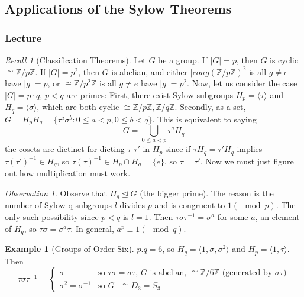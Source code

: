 \documentclass[12pt]{article}
\theoremstyle{definition}
\newtheorem{eg}[thm]{Example}
\theoremstyle{remark}
\newtheorem{obs}[thm]{Observation}
\newtheorem*{rec}{Recall}
\numberwithin{equation}{section}
\newcommand\Z{\mathbb Z}    %
\newcommand\nsub{\trianglelefteq}
\begin{document}
\vspace{15pt}


\subsection{Applications of the Sylow Theorems}

\subsubsection{Lecture}

\begin{rec}[Classification Theorems]
        Let $G$ be a group. If $|G| = p$, then $G$ is cyclic $\cong \Z/p\Z$. If $|G| = p^2$, then $G$ is abelian, and either $|cong (\Z/p\Z)^2$ is all $g\neq e$ have $|g| = p$, or $\cong \Z/p^2\Z$ is all $g\neq e$ have $|g| = p^2$. Now, let us consider the case $|G| = p\cdot q$, $p < q$ are primes: First, there exist Sylow subgroups $H_p = \langle \tau \rangle$ and $H_q = \langle \sigma \rangle$, which are both cyclic $\cong \Z/p\Z, \Z/q\Z$. Secondly, as a set, $G = H_pH_q = \{\tau^a\sigma^b:0\leq a < p, 0 \leq b < q\}$. This is equivalent to saying \begin{equation}
                G = \bigcup\limits_{0\leq a < p}\tau^aH_q
        \end{equation}
        the cosets are dictinct for dicting $\tau$ $\tau'$ in $H_p$ since if $\tau H_q = \tau'H_q$ implies $\tau(\tau')^{-1} \in H_q$, so $\tau(\tau)^{-1} \in H_p \cap H_q = \{e\}$, so $\tau = \tau'$. Now we must just figure out how multiplication must work. 
\end{rec}

\vspace{15pt}

\begin{obs}
        Observe that $H_q \nsub G$ (the bigger prime). The reason is the number of Sylow q-subgroups $l$ divides $p$ and is congruent to $1 (\mod p)$. The only such possibility since $p < q$ is $l = 1$. Then $\tau\sigma\tau^{-1} = \sigma^a$ for some $a$, an element of $H_q$, so $\tau\sigma = \sigma^a\tau$. In general, $a^p \equiv 1 (\mod q)$.
\end{obs}


\vspace{15pt}


\begin{eg}[Groups of Order Six]
        $p.q = 6$, so $H_q = \langle 1, \sigma, \sigma^2\rangle$ and $H_p = \langle 1, \tau \rangle$. Then \begin{equation}
                \tau\sigma\tau^{-1} = \left\{\begin{array}{cc}\sigma & \text{so $\tau\sigma=\sigma\tau$, $G$ is abelian, $\cong \Z/6\Z$ (generated by $\sigma\tau$)} \\ \sigma^2=\sigma^{-1} & \text{so $G$ $\cong D_3 = S_3$} \end{array}\right.
        \end{equation}
\end{eg}
\end{document}
